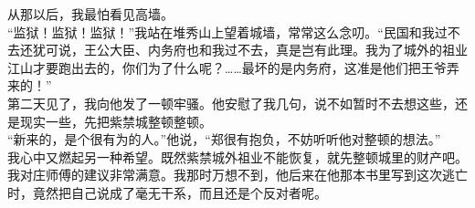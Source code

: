 从那以后，我最怕看见高墙。\\

“监狱！监狱！监狱！”我站在堆秀山上望着城墙，常常这么念叨。“民国和我过不去还犹可说，王公大臣、内务府也和我过不去，真是岂有此理。我为了城外的祖业江山才要跑出去的，你们为了什么呢？……最坏的是内务府，这准是他们把王爷弄来的！”\\

第二天见了，我向他发了一顿牢骚。他安慰了我几句，说不如暂时不去想这些，还是现实一些，先把紫禁城整顿整顿。\\

“新来的，是个很有为的人。”他说，“郑很有抱负，不妨听听他对整顿的想法。”\\

我心中又燃起另一种希望。既然紫禁城外祖业不能恢复，就先整顿城里的财产吧。我对庄师傅的建议非常满意。我那时万想不到，他后来在他那本书里写到这次逃亡时，竟然把自己说成了毫无干系，而且还是个反对者呢。
